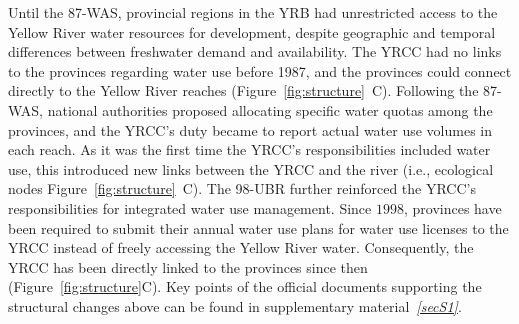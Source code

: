Until the 87-WAS, provincial regions in the YRB had unrestricted access to the Yellow River water resources for development, despite geographic and temporal differences between freshwater demand and availability.
The YRCC had no links to the provinces regarding water use before 1987, and the provinces could connect directly to the Yellow River reaches (Figure~\ref{fig:structure}~C).
Following the 87-WAS, national authorities proposed allocating specific water quotas among the provinces, and the YRCC's duty became to report actual water use volumes in each reach.
As it was the first time the YRCC's responsibilities included water use, this introduced new links between the YRCC and the river (i.e., ecological nodes Figure~\ref{fig:structure}~C).
The 98-UBR further reinforced the YRCC's responsibilities for integrated water use management.
Since $1998$, provinces have been required to submit their annual water use plans for water use licenses to the YRCC instead of freely accessing the Yellow River water.
Consequently, the YRCC has been directly linked to the provinces since then (Figure~\ref{fig:structure}C).
Key points of the official documents supporting the structural changes above can be found in supplementary material~\textit{\ref{secS1}}.


